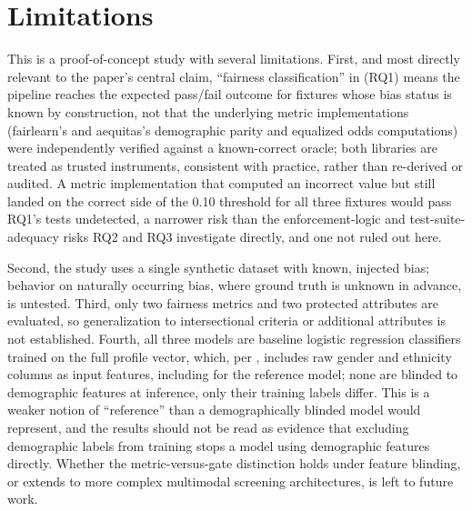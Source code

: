 \documentclass[]{einformatica}
\begin{document}
\section{Limitations}\label{sec:Limitations}

This is a proof-of-concept study with several limitations. First, and most directly relevant to the paper's central claim, ``fairness classification'' in  (RQ1) means the pipeline reaches the expected pass/fail outcome for fixtures whose bias status is known by construction, not that the underlying metric implementations (fairlearn's and aequitas's demographic parity and equalized odds computations) were independently verified against a known-correct oracle; both libraries are treated as trusted instruments, consistent with practice, rather than re-derived or audited. A metric implementation that computed an incorrect value but still landed on the correct side of the 0.10 threshold for all three fixtures would pass RQ1's tests undetected, a narrower risk than the enforcement-logic and test-suite-adequacy risks RQ2 and RQ3 investigate directly, and one not ruled out here.

Second, the study uses a single synthetic dataset with known, injected bias; behavior on naturally occurring bias, where ground truth is unknown in advance, is untested. Third, only two fairness metrics and two protected attributes are evaluated, so generalization to intersectional criteria or additional attributes is not established. Fourth, all three models are baseline logistic regression classifiers trained on the full profile vector, which, per , includes raw gender and ethnicity columns as input features, including for the reference model; none are blinded to demographic features at inference, only their training labels differ. This is a weaker notion of ``reference'' than a demographically blinded model would represent, and the results should not be read as evidence that excluding demographic labels from training stops a model using demographic features directly. Whether the metric-versus-gate distinction holds under feature blinding, or extends to more complex multimodal screening architectures, is left to future work.
\end{document}

